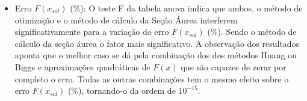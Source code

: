\begin{itemize}
            \item {Erro $F(x_{sol})$ (\%):} O teste F da tabela anova indica que ambos, o método de otimização e o método de cálculo da Seção Áurea interferem significativamente para a variação do erro $F(x_{sol})$ (\%). Sendo o método de cálculo da seção áurea o fator mais significativo. A observação dos resultados aponta que o melhor caso se dá pela combinação dos dos métodos Huang ou Biggs e aproximações quadráticas de $F(x)$ que são capazes de zerar por completo o erro. Todas as outras combinações tem o mesmo efeito sobre o erro $F(x_{sol})$ (\%), tornando-o da ordem de $10^{-15}$.
        \end{itemize}